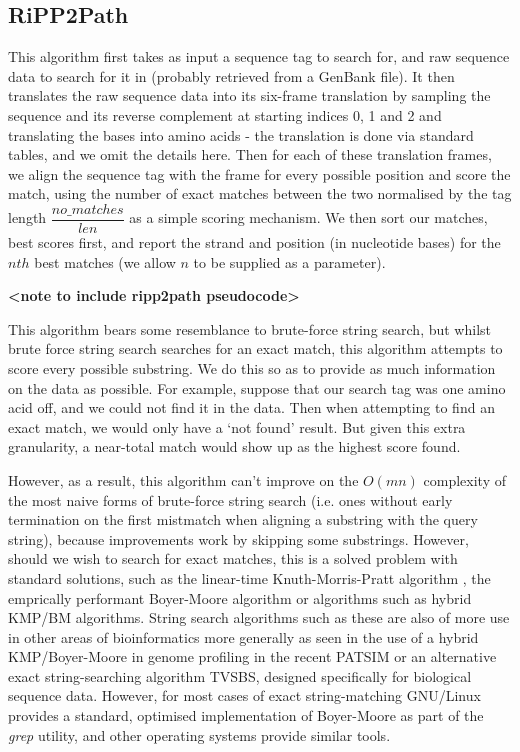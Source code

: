 \documentclass{l4proj}
\newcommand{\cit}[1]{\citep{#1}}
\begin{document}
\subsection{RiPP2Path}

This algorithm first takes as input a sequence tag to search for, and raw sequence data to search for it in (probably retrieved from a GenBank file). It then translates the raw sequence data into its six-frame translation by sampling the sequence and its reverse complement at starting indices 0, 1 and 2 and translating the bases into amino acids - the translation is done via standard tables, and we omit the details here. Then for each of these translation frames, we align the sequence tag with the frame for every possible position and score the match, using the number of exact matches between the two normalised by the tag length \(\dfrac{no\_matches}{len}\) as a simple scoring mechanism. We then sort our matches, best scores first, and report the strand and position (in nucleotide bases) for the \(nth\) best matches (we allow \(n\) to be supplied as a parameter). 

\textbf{<note to include ripp2path pseudocode>}

This algorithm bears some resemblance to brute-force string search, but whilst brute force string search searches for an exact match, this algorithm attempts to score every possible substring. We do this so as to provide as much information on the data as possible. For example, suppose that our search tag was one amino acid off, and we could not find it in the data. Then when attempting to find an exact match, we would only have a `not found' result. But given this extra granularity, a near-total match would show up as the highest score found. 

However, as a result, this algorithm can't improve on the \(O(mn)\) complexity of the most naive forms of brute-force string search (i.e. ones without early termination on the first mistmatch when aligning a substring with the query string), because improvements work by skipping some substrings. However, should we wish to search for exact matches, this is a solved problem with standard solutions, such as the linear-time Knuth-Morris-Pratt algorithm \cit{kmp}, the emprically performant Boyer-Moore algorithm \cit{boyer-moore} or algorithms such as hybrid KMP/BM algorithms. \cit{kmpbm} \cit{kmpbmtwo} String search algorithms such as these are also of more use in other areas of bioinformatics more generally as seen in the use of a hybrid KMP/Boyer-Moore in genome profiling in the recent PATSIM \cit{patsim} or an alternative exact string-searching algorithm TVSBS, \cit{tvsbs} designed specifically for biological sequence data. However, for most cases of exact string-matching GNU/Linux provides a standard, optimised implementation of Boyer-Moore as part of the \textit{grep} utility, and other operating systems provide similar tools.
\end{document}
